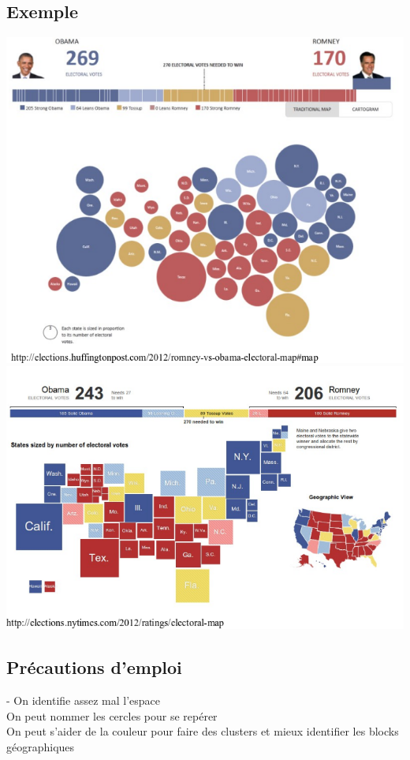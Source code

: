 \documentclass[]{book}
\begin{document}
\subsection{Exemple}\label{exemple}

\includegraphics{img/dorling2.png} \includegraphics{img/dorling3.png}

\subsection{Précautions d'emploi}\label{precautions-demploi}

- On identifie assez mal l'espace\\
On peut nommer les cercles pour se repérer\\
On peut s'aider de la couleur pour faire des clusters et mieux
identifier les blocks géographiques
\end{document}
